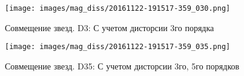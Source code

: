 \begin{figure}[H]
  \centering
  \texttt{[image: images/mag\_diss/20161122-191517-359\_030.png]}
  \caption{Совмещение звезд. D3: С учетом дисторсии 3го порядка}
  \label{fig:center_dist}
\end{figure}

\begin{figure}[H]
  \centering
  \texttt{[image: images/mag\_diss/20161122-191517-359\_035.png]}
  \caption{Совмещение звезд. D35: С учетом дисторсии 3го, 5го порядков}
  \label{fig:center_dist35}
\end{figure}





